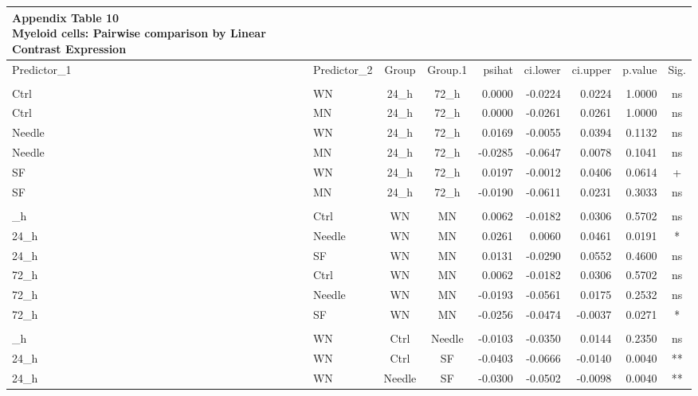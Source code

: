 \documentclass[
  12pt,
  letterpaper,
]{article}
\begin{document}
\begingroup
\fontsize{12.0pt}{14.4pt}\selectfont
\begin{longtable}{llccrrrrc}
\caption*{
{\large \textbf{Appendix Table 10}} \\ 
{\small \textbf{Myeloid cells: Pairwise comparison by Linear Contrast Expression}}
} \\ 
\toprule
Predictor\_1 & Predictor\_2 & {Group} & {Group.1} & {psihat} & {ci.lower} & {ci.upper} & {p.value} & {Sig.} \\ 
\midrule\addlinespace[2.5pt]
\multicolumn{9}{l}{Predictor: Time\_point} \\[2.5pt] 
\midrule\addlinespace[2.5pt]
Ctrl & WN & 24\_h & 72\_h & 0.0000 & -0.0224 & 0.0224 & 1.0000 & ns \\ 
Ctrl & MN & 24\_h & 72\_h & 0.0000 & -0.0261 & 0.0261 & 1.0000 & ns \\ 
Needle & WN & 24\_h & 72\_h & 0.0169 & -0.0055 & 0.0394 & 0.1132 & ns \\ 
Needle & MN & 24\_h & 72\_h & -0.0285 & -0.0647 & 0.0078 & 0.1041 & ns \\ 
SF & WN & 24\_h & 72\_h & 0.0197 & -0.0012 & 0.0406 & 0.0614 & + \\ 
SF & MN & 24\_h & 72\_h & -0.0190 & -0.0611 & 0.0231 & 0.3033 & ns \\ 
\midrule\addlinespace[2.5pt]
\multicolumn{9}{l}{Predictor: Diet} \\[2.5pt] 
\midrule\addlinespace[2.5pt]
24\_h & Ctrl & WN & MN & 0.0062 & -0.0182 & 0.0306 & 0.5702 & ns \\ 
24\_h & Needle & WN & MN & 0.0261 & 0.0060 & 0.0461 & 0.0191 & * \\ 
24\_h & SF & WN & MN & 0.0131 & -0.0290 & 0.0552 & 0.4600 & ns \\ 
72\_h & Ctrl & WN & MN & 0.0062 & -0.0182 & 0.0306 & 0.5702 & ns \\ 
72\_h & Needle & WN & MN & -0.0193 & -0.0561 & 0.0175 & 0.2532 & ns \\ 
72\_h & SF & WN & MN & -0.0256 & -0.0474 & -0.0037 & 0.0271 & * \\ 
\midrule\addlinespace[2.5pt]
\multicolumn{9}{l}{Predictor: Route} \\[2.5pt] 
\midrule\addlinespace[2.5pt]
24\_h & WN & Ctrl & Needle & -0.0103 & -0.0350 & 0.0144 & 0.2350 & ns \\ 
24\_h & WN & Ctrl & SF & -0.0403 & -0.0666 & -0.0140 & 0.0040 & ** \\ 
24\_h & WN & Needle & SF & -0.0300 & -0.0502 & -0.0098 & 0.0040 & ** \\ 

\end{longtable}
\end{document}

